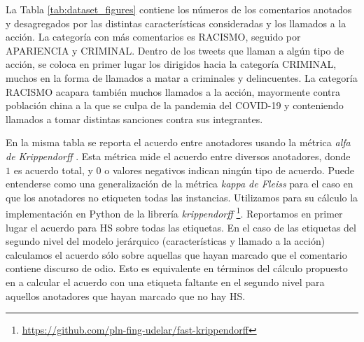 La Tabla \ref{tab:dataset_figures} contiene los números de los comentarios anotados y desagregados por las distintas características consideradas y los llamados a la acción. La categoría con más comentarios es RACISMO, seguido por APARIENCIA y CRIMINAL. Dentro de los tweets que llaman a algún tipo de acción, se coloca en primer lugar los dirigidos hacia la categoría CRIMINAL, muchos en la forma de llamados a matar a criminales y delincuentes. La categoría RACISMO acapara también muchos llamados a la acción, mayormente contra población china a la que se culpa de la pandemia del COVID-19 y conteniendo llamados a tomar distintas sanciones contra sus integrantes.



En la misma tabla se reporta el acuerdo entre anotadores usando la métrica \emph{alfa de Krippendorff} \cite{krippendorff2018content}. Esta métrica mide el acuerdo entre diversos anotadores, donde $1$ es acuerdo total, y 0 o valores negativos indican ningún tipo de acuerdo. Puede entenderse como una generalización de la métrica \emph{kappa de Fleiss} para el caso en que los anotadores no etiqueten todas las instancias. Utilizamos para su cálculo la implementación en Python de la librería \emph{krippendorff} \footnote{\url{https://github.com/pln-fing-udelar/fast-krippendorff}}. Reportamos en primer lugar el acuerdo para HS sobre todas las etiquetas. En el caso de las etiquetas del segundo nivel del modelo jerárquico (características y llamado a la acción) calculamos el acuerdo sólo sobre aquellas que hayan marcado que el comentario contiene discurso de odio. Esto es equivalente en términos del cálculo propuesto en \citet{krippendorff2018content} a calcular el acuerdo con una etiqueta faltante en el segundo nivel para aquellos anotadores que hayan marcado que no hay HS.

